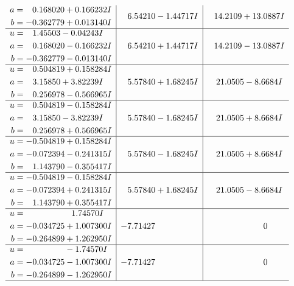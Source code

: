 \documentclass[1p]{elsarticle_modified}
\theoremstyle{definition}
\begin{document}
$$\begin{array}{c|c|c}
\begin{aligned}
a &= \phantom{-}0.168020 + 0.166232 I \\
b &= -0.362779 + 0.013140 I\end{aligned}
 & \phantom{-}6.54210 - 1.44717 I & \phantom{-}14.2109 + 13.0887 I \\ \hline\begin{aligned}
u &= \phantom{-}1.45503 - 0.04243 I \\
a &= \phantom{-}0.168020 - 0.166232 I \\
b &= -0.362779 - 0.013140 I\end{aligned}
 & \phantom{-}6.54210 + 1.44717 I & \phantom{-}14.2109 - 13.0887 I \\ \hline\begin{aligned}
u &= \phantom{-}0.504819 + 0.158284 I \\
a &= \phantom{-}3.15850 + 3.82239 I \\
b &= \phantom{-}0.256978 - 0.566965 I\end{aligned}
 & \phantom{-}5.57840 + 1.68245 I & \phantom{-}21.0505 - 8.6684 I \\ \hline\begin{aligned}
u &= \phantom{-}0.504819 - 0.158284 I \\
a &= \phantom{-}3.15850 - 3.82239 I \\
b &= \phantom{-}0.256978 + 0.566965 I\end{aligned}
 & \phantom{-}5.57840 - 1.68245 I & \phantom{-}21.0505 + 8.6684 I \\ \hline\begin{aligned}
u &= -0.504819 + 0.158284 I \\
a &= -0.072394 - 0.241315 I \\
b &= \phantom{-}1.143790 - 0.355417 I\end{aligned}
 & \phantom{-}5.57840 - 1.68245 I & \phantom{-}21.0505 + 8.6684 I \\ \hline\begin{aligned}
u &= -0.504819 - 0.158284 I \\
a &= -0.072394 + 0.241315 I \\
b &= \phantom{-}1.143790 + 0.355417 I\end{aligned}
 & \phantom{-}5.57840 + 1.68245 I & \phantom{-}21.0505 - 8.6684 I \\ \hline\begin{aligned}
u &= \phantom{-0.000000 -}1.74570 I \\
a &= -0.034725 + 1.007300 I \\
b &= -0.264899 + 1.262950 I\end{aligned}
 & -7.71427\phantom{ +0.000000I} & \phantom{-0.000000 } 0 \\ \hline\begin{aligned}
u &= \phantom{-0.000000 } -1.74570 I \\
a &= -0.034725 - 1.007300 I \\
b &= -0.264899 - 1.262950 I\end{aligned}
 & -7.71427\phantom{ +0.000000I} & \phantom{-0.000000 } 0\\
 \hline 
 \end{array}$$\newpage\newpage\renewcommand{\arraystretch}{1}
\end{document}
